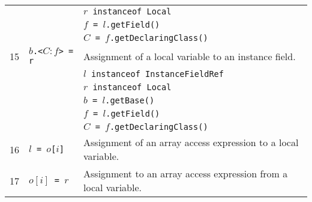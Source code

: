 \documentclass{article}
\begin{document}
\begin{scriptsize}
\begin{tabular}{lll}
&                & \texttt{$r$ instanceof Local}\\
&                & \texttt{$f$ = $l$.getField()}\\
&                & \texttt{$C$ = $f$.getDeclaringClass()}\\
\hline
15 & \texttt{$b$.<$C:f$> = r}       & Assignment of a local variable to an instance field.\\
&                & \texttt{$l$ instanceof InstanceFieldRef} \\
&                & \texttt{$r$ instanceof Local}\\
&                & \texttt{$b$ = $l$.getBase()}\\
&                & \texttt{$f$ = $l$.getField()}\\
&                & \texttt{$C$ = $f$.getDeclaringClass()}\\
\hline
16 & \texttt{$l$ = $o$[$i$]}              & Assignment of an array access expression to a local variable.\\
\hline
17 & \texttt{$o[i]$ = $r$}              & Assignment to an array access expression from a local variable.\\
\hline
\end{tabular}
\end{scriptsize}
\end{document}
